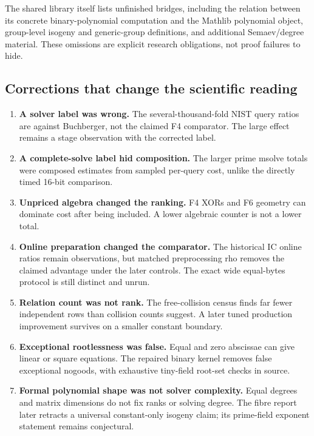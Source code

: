 The shared library itself lists unfinished bridges, including the
relation between its concrete binary-polynomial computation and the
Mathlib polynomial object, group-level isogeny and generic-group
definitions, and additional Semaev/degree material. These omissions are
explicit research obligations, not proof failures to hide.

\subsection{Corrections that change the scientific reading}

\begin{enumerate}
\item \textbf{A solver label was wrong.} The several-thousand-fold NIST
query ratios are against Buchberger, not the claimed F4 comparator.
The large effect remains a stage observation with the corrected label.
\item \textbf{A complete-solve label hid composition.} The larger prime
msolve totals were composed estimates from sampled per-query cost, unlike
the directly timed 16-bit comparison.
\item \textbf{Unpriced algebra changed the ranking.} F4 XORs and F6
geometry can dominate cost after being included. A lower algebraic
counter is not a lower total.
\item \textbf{Online preparation changed the comparator.} The historical
IC online ratios remain observations, but matched preprocessing rho
removes the claimed advantage under the later controls. The exact wide
equal-bytes protocol is still distinct and unrun.
\item \textbf{Relation count was not rank.} The free-collision census
finds far fewer independent rows than collision counts suggest. A later
tuned production improvement survives on a smaller constant boundary.
\item \textbf{Exceptional rootlessness was false.} Equal and zero
abscissae can give linear or square equations. The repaired binary kernel
removes false exceptional nogoods, with exhaustive tiny-field root-set
checks in source.
\item \textbf{Formal polynomial shape was not solver complexity.}
Equal degrees and matrix dimensions do not fix ranks or solving degree.
The fibre report later retracts a universal constant-only isogeny claim;
its prime-field exponent statement remains conjectural.

\end{enumerate}
